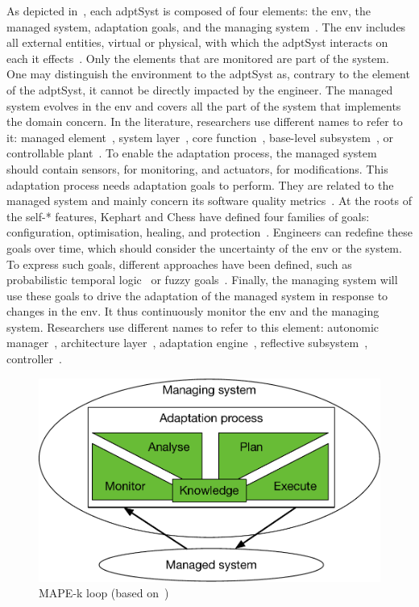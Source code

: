 As depicted in~, each \gls{adptSyst} is composed of four elements: the \gls{env}, the managed system, adaptation goals, and the managing system~\cite{DBLP:books/sp/19/Weyns19}.
The \gls{env} includes all external entities, virtual or physical, with which the \gls{adptSyst} interacts on each it effects~\cite{DBLP:journals/ansoft/Jackson97}.
Only the elements that are monitored are part of the system.
One may distinguish the environment to the \gls{adptSyst} as, contrary to the element of the \gls{adptSyst}, it cannot be directly impacted by the engineer.
The managed system evolves in the \gls{env} and covers all the part of the system that implements the domain concern.
In the literature, researchers use different names to refer to it: managed element~\cite{DBLP:journals/computer/KephartC03}, system layer~\cite{DBLP:journals/computer/GarlanCHSS04}, core function~\cite{DBLP:journals/taas/SalehieT09}, base-level subsystem~\cite{DBLP:journals/taas/WeynsMA12}, or controllable plant~\cite{DBLP:conf/icse/FilieriHM14}.
To enable the adaptation process, the managed system should contain sensors, for monitoring, and actuators, for modifications.
This adaptation process needs adaptation goals to perform.
They are related to the managed system and mainly concern its software quality metrics~\cite{DBLP:conf/ecsa/WeynsA13}.
At the roots of the self-* features, Kephart and Chess have defined four families of goals: configuration, optimisation, healing, and protection~\cite{DBLP:journals/computer/KephartC03}.  
Engineers can redefine these goals over time, which should consider the uncertainty of the \gls{env} or the system.
To express such goals, different approaches have been defined, such as probabilistic temporal logic~\cite{DBLP:journals/tse/CalinescuGKMT11} or fuzzy goals~\cite{DBLP:conf/re/BaresiPS10}.
Finally, the managing system will use these goals to drive the adaptation of the managed system in response to changes in the \gls{env}.
It thus continuously monitor the \gls{env} and the managing system.
Researchers use different names to refer to this element: autonomic manager~\cite{DBLP:journals/computer/KephartC03}, architecture layer~\cite{DBLP:journals/computer/GarlanCHSS04}, adaptation engine~\cite{DBLP:journals/taas/SalehieT09}, reflective subsystem~\cite{DBLP:journals/taas/WeynsMA12}, controller~\cite{DBLP:conf/icse/FilieriHM14}.

\begin{figure}
	\centering
	\includegraphics[width=0.6\linewidth]{img/chapt-background/adptSyst/mapek}
	\caption{MAPE-k loop (based on~\cite{DBLP:journals/computer/KephartC03})}
	\label{fig:background:adptSyst:principles:mapek}
\end{figure}

